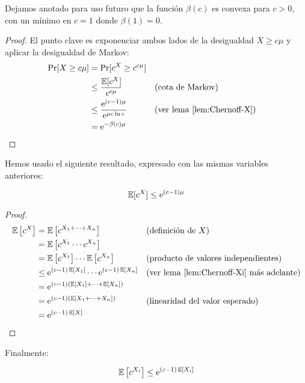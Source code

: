   Dejamos anotado para uso futuro
  que la función \(\beta(c)\) es convexa para \(c > 0\),
  con un mínimo en \(c = 1\) donde \(\beta(1) = 0\).
  \begin{proof}
    El punto clave es exponenciar ambos lados de la desigualdad
    \(X \ge c \mu\) y aplicar la desigualdad de Markov:
    \begin{align*}
      \Pr[X \ge c \mu]
        &=   \Pr[c^X \ge c^{c \mu}] \\
        &\le \frac{\operatorname{\mathbb{E}}[c^X]}{c^{c \mu}}
                && \text{(cota de Markov)} \\
        &\le \frac{\mathrm{e^{(c - 1) \mu}}}{\mathrm{e}^{\mu c \ln c}}
               && \text{(ver lema~\ref{lem:Chernoff-X})} \\
        &=   \mathrm{e}^{- \beta(c) \mu}
    \end{align*}
  \end{proof}
  Hemos usado el siguiente resultado,
  expresado con las mismas variables anteriores:
  \begin{lemma}
    \label{lem:Chernoff-X}
    \begin{equation*}
      \operatorname{\mathbb{E}}[c^X]
        \le \mathrm{e}^{(c - 1) \mu}
    \end{equation*}
  \end{lemma}
  \begin{proof}
    \begin{align*}
      \operatorname{\mathbb{E}}\left[ c^X \right]
        &= \operatorname{\mathbb{E}}\left[ c^{X_1 + \dotsb + X_n} \right]
               && \text{(definición de \(X\))} \\
        &=   \operatorname{\mathbb{E}}\left[ c^{X_1} \dotsm c^{X_n} \right] \\
        &=   \operatorname{\mathbb{E}}\left[ c^{X_1} \right] \dotsm \operatorname{\mathbb{E}}\left[ c^{X_n} \right]
               && \text{(producto de valores independientes)} \\
        &\le \mathrm{e}^{(c - 1) \operatorname{\mathbb{E}}[X_1]}
                \dotsm \mathrm{e}^{(c - 1) \operatorname{\mathbb{E}}[X_n]}
               && \text{(ver lema~\ref{lem:Chernoff-Xi} más adelante)} \\
        &= \mathrm{e}^{(c - 1) (\operatorname{\mathbb{E}}[X_1] + \dotsb + \operatorname{\mathbb{E}}[X_n])} \\
        &= \mathrm{e}^{(c - 1) (\operatorname{\mathbb{E}}[X_1 + \dotsb + X_n])}
               && \text{(linearidad del valor esperado)} \\
        &= \mathrm{e}^{(c - 1) \operatorname{\mathbb{E}}[X]}
    \end{align*}
  \end{proof}
  Finalmente:
  \begin{lemma}
    \label{lem:Chernoff-Xi}
    \begin{equation*}
      \operatorname{\mathbb{E}}\left[ c^{X_i} \right]
        \le \mathrm{e}^{(c - 1) \operatorname{\mathbb{E}}[X_i]}
    \end{equation*}
  \end{lemma}
